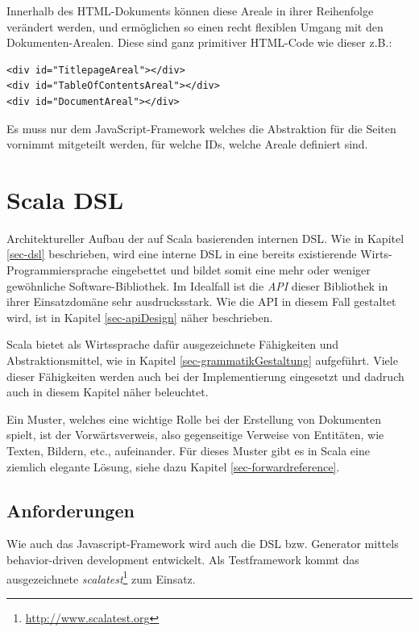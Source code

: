 Innerhalb des HTML-Dokuments können diese Areale in ihrer Reihenfolge
verändert werden, und ermöglichen so einen recht flexiblen Umgang mit
den Doku\-men\-ten-Arealen. Diese sind ganz primitiver HTML-Code wie dieser
z.B.:

\begin{verbatim}
<div id="TitlepageAreal"></div>
<div id="TableOfContentsAreal"></div>
<div id="DocumentAreal"></div>
\end{verbatim}

Es muss nur dem JavaScript-Framework welches die Abstraktion für die
Seiten vornimmt mitgeteilt werden, für welche IDs, welche Areale definiert
sind.


\section{Scala DSL}\label{sec-scalaDSL}

Architektureller Aufbau der auf Scala basierenden internen DSL. Wie in
Kapitel \ref{sec-dsl} beschrieben, wird eine interne DSL in eine bereits
existierende Wirts-Programmiersprache eingebettet und bildet somit
eine mehr oder weniger gewöhn\-liche Software-Bibliothek. Im Idealfall ist
die \emph{API} dieser Bibliothek in ihrer Einsatzdomäne sehr ausdrucksstark.
Wie die API in diesem Fall gestaltet wird, ist in Kapitel \ref{sec-apiDesign}
näher beschrieben.

Scala bietet als Wirtssprache dafür ausgezeichnete Fähigkeiten und
Abstraktionsmittel, wie in Kapitel \ref{sec-grammatikGestaltung} aufgeführt.
Viele dieser Fähigkeiten werden auch bei der Implementierung eingesetzt
und dadruch auch in diesem Kapitel näher beleuchtet.

Ein Muster, welches eine wichtige Rolle bei der Erstellung von Dokumenten
spielt, ist der Vorwärtsverweis, also gegenseitige Verweise von Entitäten,
wie Texten, Bildern, etc., aufeinander. Für dieses Muster gibt es in Scala
eine ziemlich elegante Lösung, siehe dazu Kapitel \ref{sec-forwardreference}.

\subsection{Anforderungen}

Wie auch das Javascript-Framework wird auch die DSL bzw. Generator
mittels behavior-driven development entwickelt. Als Testframework
kommt das ausgezeichnete
\emph{scalatest}\footnote{\url{http://www.scalatest.org}} zum Einsatz.

